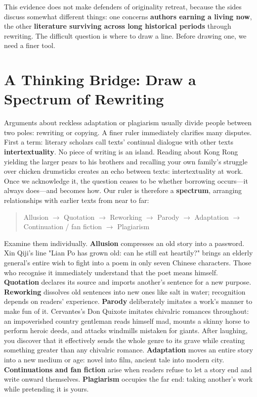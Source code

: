 This evidence does not make defenders of originality retreat, because the sides discuss somewhat different things: one concerns \textbf{authors earning a living now}, the other \textbf{literature surviving across long historical periods} through rewriting. The difficult question is where to draw a line. Before drawing one, we need a finer tool.

\section[Thinking Bridge: A Rewriting Spectrum]{A Thinking Bridge: Draw a Spectrum of Rewriting}
Arguments about reckless adaptation or plagiarism usually divide people between two poles: rewriting or copying. A finer ruler immediately clarifies many disputes. First a term: literary scholars call texts' continual dialogue with other texts \textbf{intertextuality}. No piece of writing is an island. Reading about Kong Rong yielding the larger pears to his brothers and recalling your own family's struggle over chicken drumsticks creates an echo between texts: intertextuality at work. Once we acknowledge it, the question ceases to be whether borrowing occurs---it always does---and becomes how. Our ruler is therefore a \textbf{spectrum}, arranging relationships with earlier texts from near to far:

\begin{quote}
Allusion $\rightarrow$ Quotation $\rightarrow$ Reworking $\rightarrow$ Parody $\rightarrow$ Adaptation $\rightarrow$ Continuation / fan fiction $\rightarrow$ Plagiarism
\end{quote}
Examine them individually. \textbf{Allusion} compresses an old story into a password. Xin Qiji's line "Lian Po has grown old: can he still eat heartily?" brings an elderly general's entire wish to fight into a poem in only seven Chinese characters. Those who recognise it immediately understand that the poet means himself. \textbf{Quotation} declares its source and imports another's sentence for a new purpose. \textbf{Reworking} dissolves old sentences into new ones like salt in water; recognition depends on readers' experience. \textbf{Parody} deliberately imitates a work's manner to make fun of it. Cervantes's Don Quixote imitates chivalric romances throughout: an impoverished country gentleman reads himself mad, mounts a skinny horse to perform heroic deeds, and attacks windmills mistaken for giants. After laughing, you discover that it effectively sends the whole genre to its grave while creating something greater than any chivalric romance. \textbf{Adaptation} moves an entire story into a new medium or age: novel into film, ancient tale into modern city. \textbf{Continuations and fan fiction} arise when readers refuse to let a story end and write onward themselves. \textbf{Plagiarism} occupies the far end: taking another's work while pretending it is yours.

